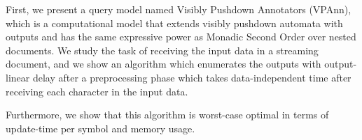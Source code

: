 First, we present a query model named Visibly Pushdown Annotators (VPAnn), which is a computational model that extends visibly pushdown automata with outputs and has the same expressive power as Monadic Second Order over nested documents. We study the task of receiving the input data in a streaming document, and we show an algorithm which enumerates the outputs with output-linear delay after a preprocessing phase which takes data-independent time after receiving each character in the input data.

Furthermore, we show that this algorithm is worst-case optimal in terms of update-time per symbol and memory usage.